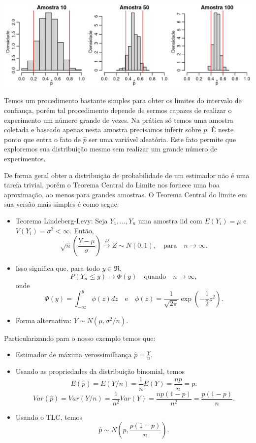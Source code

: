 \documentclass[
  10pt,
  a4paper]{book}
\providecommand{\tightlist}{%
  \setlength{\itemsep}{0pt}\setlength{\parskip}{0pt}}
\begin{document}
\begin{center}\includegraphics[width=0.99\linewidth]{figures/unnamed-chunk-382-1} \end{center}

Temos um procedimento bastante simples para obter os limites do intervalo de confiança, porém tal procedimento depende de sermos capazes de realizar o experimento um número grande de vezes. Na prática só temos uma amostra coletada e baseado apenas nesta amostra precisamos inferir sobre \(p\). É neste ponto que entra o fato de \(\hat{p}\) ser uma variável aleatória. Este fato permite que exploremos sua distribuição mesmo sem realizar um grande número de experimentos.

De forma geral obter a distribuição de probabilidade de um estimador não é uma tarefa trivial, porém o Teorema Central do Limite nos fornece uma boa aproximação, ao menos para grandes amostras. O Teorema Central do limite em sua versão mais simples é como segue:

\begin{itemize}
\tightlist
\item
  Teorema Lindeberg-Levy: Seja \(Y_1, \ldots, Y_n\) uma amostra iid
  com \(E(Y_i) = \mu\) e \(V(Y_i) = \sigma^2 < \infty\).
  Então,
  \[ \sqrt{n}\left ( \frac{\bar{Y} - \mu}{\sigma} \right ) \overset{D}{\to} Z \sim N(0,1), \quad \text{para} \quad n \to \infty.\]
\item
  Isso significa que, para todo \(y \in \Re\),
  \[ P(Y_n \leq y) \to \Phi (y) \quad \text{quando} \quad n \to \infty,\] onde
  \[ \Phi(y) = \int_{-\infty}^y \phi(z) dz \quad \text{e} \quad 
  \phi(z) = \frac{1}{\sqrt{2\pi}} \exp \left ( -\frac{1}{2} z^2 \right ).\]
\item
  Forma alternativa: \(\bar{Y} \sim N(\mu, \sigma^2/n).\)
\end{itemize}

Particularizando para o nosso exemplo temos que:

\begin{itemize}
\tightlist
\item
  Estimador de máxima verossimilhança \(\hat{p} = \frac{Y}{n}.\)
\item
  Usando as propriedades da distribuição binomial, temos
  \[E(\hat{p}) = E(Y/n) = \frac{1}{n}E(Y) = \frac{np}{n} = p.\]
  \[Var(\hat{p}) = Var(Y/n) = \frac{1}{n^2}Var(Y) = \frac{np(1-p)}{n^2} = \frac{p(1-p)}{n}.\]
\item
  Usando o TLC, temos
  \[\hat{p} \sim N(p, \frac{p(1-p)}{n}).\]
\end{itemize}
\end{document}
